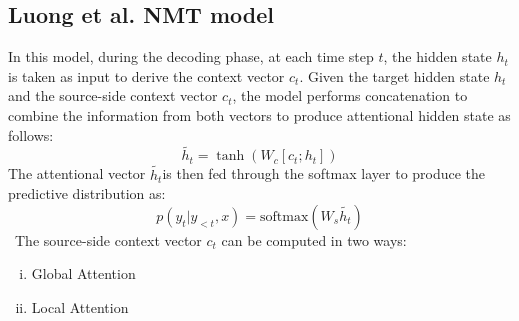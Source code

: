 \subsection{Luong et al. NMT model}
In this model, during the decoding phase, at each time step $t$, the hidden state $h_t$ is taken as input to derive the context vector $c_t$. Given the target hidden state $h_t$ and the source-side context vector $c_t$, the model performs concatenation to combine the information from both vectors to produce attentional hidden state as follows:
\begin{equation}
\label{eq:1.7}
\tilde{h_t} = \tanh (W_c[c_t; h_t])
\end{equation}
The attentional vector $\tilde{h_t} $is then fed through the softmax layer to produce the predictive distribution as:
\begin{equation}
\label{eq:1.8}
p(y_t|y_{<t}, x) = \text{softmax}(W_s\tilde{h_t})
\end{equation}
\
The source-side context vector $c_t$ can be computed in two ways:
\begin{enumerate}[i.]
\item Global Attention
\item Local Attention
\end{enumerate}

